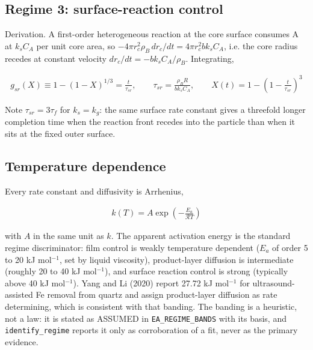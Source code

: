 \documentclass[10pt,a4paper,twoside]{report}
\begin{document}
\subsection*{Regime 3: surface-reaction control}

Derivation. A first-order heterogeneous reaction at the core surface consumes A at $k_s C_A$ per unit core area, so $-4\pi r_c^2 \rho_B \, dr_c/dt = 4\pi r_c^2 b k_s C_A$, i.e. the core radius recedes at constant velocity $dr_c/dt = -b k_s C_A/\rho_B$. Integrating,

\begin{equation*}
\begin{gathered}
g_{sr}(X) \equiv 1 - (1-X)^{1/3} = \frac{t}{\tau_{sr}}, \qquad \boxed{\tau_{sr} = \frac{\rho_B R}{b k_s C_A}}, \qquad X(t) = 1 - \left(1 - \frac{t}{\tau_{sr}}\right)^3
\end{gathered}
\end{equation*}

Note $\tau_{sr} = 3 \tau_f$ for $k_s = k_g$: the same surface rate constant gives a threefold longer completion time when the reaction front recedes into the particle than when it sits at the fixed outer surface.

\subsection*{Temperature dependence}

Every rate constant and diffusivity is Arrhenius,

\begin{equation*}
\begin{gathered}
k(T) = A \exp\!\left(-\frac{E_a}{\mathcal{R} T}\right)
\end{gathered}
\end{equation*}

with $A$ in the same unit as $k$. The apparent activation energy is the standard regime discriminator: film control is weakly temperature dependent ($E_a$ of order 5 to 20 kJ mol$^{-1}$, set by liquid viscosity), product-layer diffusion is intermediate (roughly 20 to 40 kJ mol$^{-1}$), and surface reaction control is strong (typically above 40 kJ mol$^{-1}$). Yang and Li (2020) report 27.72 kJ mol$^{-1}$ for ultrasound-assisted Fe removal from quartz and assign product-layer diffusion as rate determining, which is consistent with that banding. The banding is a heuristic, not a law: it is stated as ASSUMED in \texttt{EA\_REGIME\_BANDS} with its basis, and \texttt{identify\_regime} reports it only as corroboration of a fit, never as the primary evidence.
\end{document}
